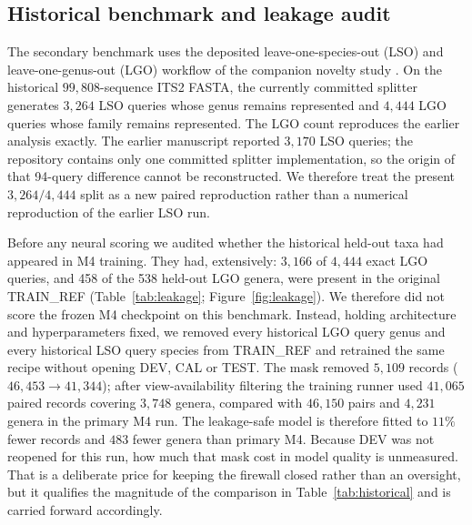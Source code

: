 \documentclass[11pt]{article}
\begin{document}
\subsection{Historical benchmark and leakage audit}
The secondary benchmark uses the deposited leave-one-species-out (LSO) and
leave-one-genus-out (LGO) workflow of the companion novelty study
\cite{obrien2026flag}. On the historical $99{,}808$-sequence ITS2 FASTA, the
currently committed splitter generates $3{,}264$ LSO queries whose genus remains
represented and $4{,}444$ LGO queries whose family remains represented. The LGO
count reproduces the earlier analysis exactly. The earlier manuscript reported
$3{,}170$ LSO queries; the repository contains only one committed splitter
implementation, so the origin of that 94-query difference cannot be
reconstructed. We therefore treat the present $3{,}264/4{,}444$ split as a new
paired reproduction rather than a numerical reproduction of the earlier LSO run.

Before any neural scoring we audited whether the historical held-out taxa had
appeared in M4 training. They had, extensively: $3{,}166$ of $4{,}444$ exact LGO
queries, and 458 of the 538 held-out LGO genera, were present in the original
TRAIN\_REF (Table~\ref{tab:leakage}; Figure~\ref{fig:leakage}). We therefore did
not score the frozen M4 checkpoint on this benchmark. Instead, holding
architecture and hyperparameters fixed, we removed every historical LGO query
genus and every historical LSO query species from TRAIN\_REF and retrained the
same recipe without opening DEV, CAL or TEST. The mask removed $5{,}109$ records
($46{,}453\rightarrow41{,}344$); after view-availability filtering the training
runner used $41{,}065$ paired records covering $3{,}748$ genera, compared with
$46{,}150$ pairs and $4{,}231$ genera in the primary M4 run. The leakage-safe
model is therefore fitted to $11\%$ fewer records and $483$ fewer genera than
primary M4. Because DEV was not reopened for this run, how much that mask cost
in model quality is unmeasured. That is a deliberate price for keeping the
firewall closed rather than an oversight, but it qualifies the magnitude of the
comparison in Table~\ref{tab:historical} and is carried forward accordingly.
\end{document}
